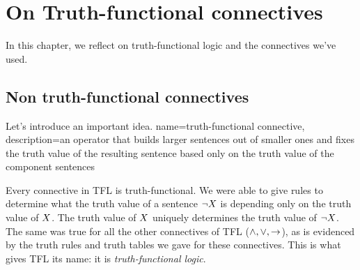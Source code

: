 \begin{practiceproblems}
\begin{earg}


\end{earg}



\end{practiceproblems}



\chapter{On Truth-functional connectives}
\label{s:TruthFunctionality}
In this chapter, we reflect on truth-functional logic and the connectives we've used.
\section{Non truth-functional connectives}

Let's introduce an important idea.
{
name=truth-functional connective,
description={an operator that builds larger sentences out of smaller ones and fixes the \gls{truth value} of the resulting sentence based only on the truth value of the component sentences}
}

Every connective in TFL is truth-functional. We were able to give rules to determine what the truth value of a sentence $\neg X$ is depending only on the truth value of $X$. The truth value of $X$ uniquely determines the truth value of $\neg X$. The same was true for all the other connectives of TFL ($\mathbin{\wedge},\vee,\rightarrow$), as is evidenced by the truth rules and truth tables we gave for these connectives. This is what gives TFL its name: it is \emph{truth-functional logic}.


